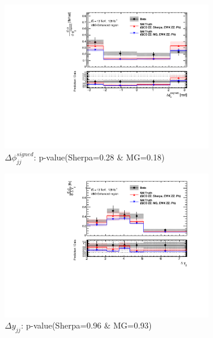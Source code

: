 \begin{figure}[!htb]
\begin{subfigure}{.49\textwidth}
        \centering
        \includegraphics[width=.98\linewidth]{figures/Results/CrossSection_VBSEnhanced/xs_dphi_SR.pdf}
        \caption{ \footnotesize{$\Delta \phi _{jj}^{signed}$: p-value(Sherpa=0.28 $\&$ MG=0.18)} }
    \end{subfigure}
    \begin{subfigure}{.49\textwidth}
        \centering
        \includegraphics[width=.98\linewidth]{figures/Results/CrossSection_VBSEnhanced/xs_dy_SR.pdf}
        \caption{ \footnotesize{$\Delta y_{jj}$: p-value(Sherpa=0.96 $\&$ MG=0.93)} }
    \end{subfigure}\\
    \begin{subfigure}{.49\textwidth}
        \centering

\end{subfigure}
\end{figure}

